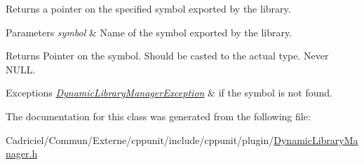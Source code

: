 Returns a pointer on the specified symbol exported by the library. 


\begin{DoxyParams}{Parameters}
{\em symbol} & Name of the symbol exported by the library. \\
\hline
\end{DoxyParams}
\begin{DoxyReturn}{Returns}
Pointer on the symbol. Should be casted to the actual type. Never {\ttfamily N\-U\-L\-L}. 
\end{DoxyReturn}

\begin{DoxyExceptions}{Exceptions}
{\em \hyperlink{class_dynamic_library_manager_exception}{Dynamic\-Library\-Manager\-Exception}} & if the symbol is not found. \\
\hline
\end{DoxyExceptions}


The documentation for this class was generated from the following file\-:\begin{DoxyCompactItemize}
\item 
Cadriciel/\-Commun/\-Externe/cppunit/include/cppunit/plugin/\hyperlink{_dynamic_library_manager_8h}{Dynamic\-Library\-Manager.\-h}\end{DoxyCompactItemize}
